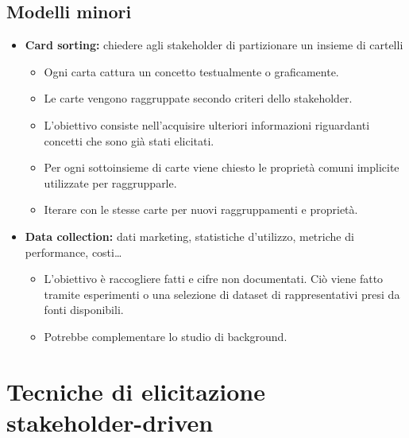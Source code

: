 \documentclass[../main.tex]{subfiles}
\begin{document}
\subsection{Modelli minori}
\begin{itemize}
	\item \textbf{Card sorting:} chiedere agli stakeholder di partizionare un insieme  di cartelli
	\begin{itemize}
		\item Ogni carta cattura un concetto testualmente o graficamente.
		\item Le carte vengono raggruppate secondo criteri dello stakeholder.
		\item L'obiettivo consiste nell'acquisire ulteriori informazioni riguardanti concetti che sono già stati elicitati.
		\item Per ogni sottoinsieme di carte viene chiesto le proprietà comuni implicite utilizzate per raggrupparle.
		\item Iterare con le stesse carte per nuovi raggruppamenti e proprietà. 
	\end{itemize}
\end{itemize}
\begin{itemize}
	\item \textbf{Data collection:} dati marketing, statistiche d'utilizzo, metriche di performance, costi\dots
	\begin{itemize}
		\item L'obiettivo è raccogliere fatti e cifre non documentati. Ciò viene fatto tramite esperimenti o una selezione di dataset di rappresentativi presi da fonti disponibili.
		\item Potrebbe complementare lo studio di background. 
	\end{itemize}
\end{itemize}
\section{Tecniche di elicitazione stakeholder-driven}
\end{document}
